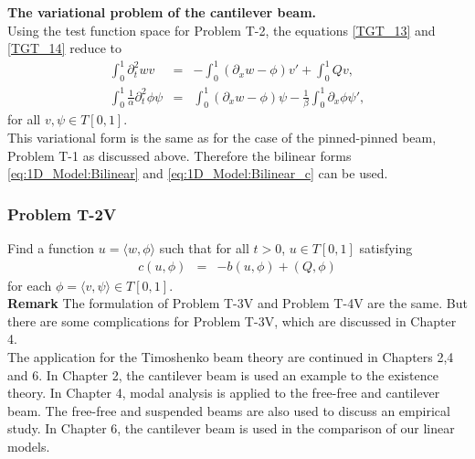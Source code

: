 \documentclass[../../main.tex]{subfiles}
\begin{document}
\textbf{The variational problem of the cantilever beam.}\\

Using the test function space for Problem T-2, the equations \eqref{TGT_13} and \eqref{TGT_14} reduce to
\begin{eqnarray}
	\int_{0}^{1} \partial_{t}^{2} w v &=& -\int_{0}^{1}(\partial_x w - \phi) v' + \int_{0}^{1} Q v, \label{eq:1D_Model:ProblemT1V1}\\
	\int_{0}^{1}\frac{1}{\alpha} \partial_{t}^{2} \phi \psi &=&   \int_{0}^{1} (\partial_x w -\phi) \psi - \frac{1}{\beta} \int_{0}^{1}\partial_x \phi \psi',\label{eq:1D_Model:ProblemT1V2}
\end{eqnarray}
for all $v, \psi \in T[0,1]$.\\

This variational form is the same as for the case of the pinned-pinned beam, Problem T-1 as discussed above. Therefore the bilinear forms \eqref{eq:1D_Model:Bilinear} and \eqref{eq:1D_Model:Bilinear_c} can be used.

\subsubsection*{Problem T-2V}\label{sssec:1D_Model:ProblemT1V}
Find a function ${u} = \langle w, \phi \rangle$ such that for all $t >0$, ${u} \in  T[0,1]$ satisfying
\begin{eqnarray}
	c(u,{\phi}) &=& -b({u},{\phi}) + (Q,{\phi}) \label{var_form_timo}
\end{eqnarray} for each ${\phi} = \langle v, \psi \rangle \in T[0,1]$. \\

\textbf{Remark} The formulation of Problem T-3V and Problem T-4V are the same. But there are some complications for Problem T-3V, which are discussed in Chapter 4.\\

The application for the Timoshenko beam theory are continued in Chapters 2,4 and 6. In Chapter 2, the cantilever beam is used an example to the existence theory. In Chapter 4, modal analysis is applied to the free-free and cantilever beam. The free-free and suspended beams are also used to discuss an empirical study. In Chapter 6, the cantilever beam is used in the comparison of our linear models.
\end{document}
